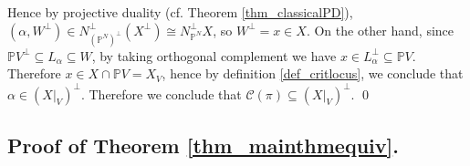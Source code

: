\documentclass[12pt]{amsart}
\begin{document}
Hence by projective duality (cf. Theorem \ref{thm_classicalPD}), $(\alpha,W^{\perp})\in N_{(\mathbb P^N)^{\perp}}^{\perp}(X^{\perp})\cong N_{\mathbb P^N}^{\perp}X$, so $W^{\perp}=x\in X$. On the other hand, since $\mathbb PV^{\perp}\subseteq L_{\alpha}\subseteq W$, by taking orthogonal complement we have $x\in L_{\alpha}^{\perp}\subseteq \mathbb PV$. Therefore $x\in X\cap \mathbb PV=X_V$, hence by definition \ref{def_critlocus}, we conclude that $\alpha\in (X|_V)^{\perp}$.  Therefore we conclude that $\mathcal{C}(\pi)\subseteq\left( X\vert_V\right)^{\perp}$.    \qed\\





\subsection{Proof of Theorem \ref{thm_mainthmequiv}.}
\end{document}
